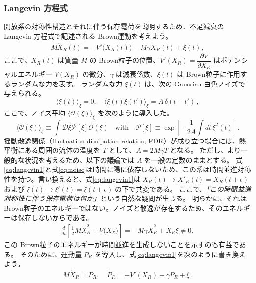 \subsubsection{Langevin 方程式}
\label{section:Langevin}
開放系の対称性構造とそれに伴う保存電荷を説明するため、不足減衰の Langevin 方程式で記述される Brown運動を考えよう。
\begin{align}
 M \ddot X_R (t) =- V'\big(X_R(t)\big) - M \gamma \dot X_R(t) +\xi (t) \,,
 \label{eq:langevin1}
\end{align}
ここで、$X_R(t)$ は質量 $M$ の Brown粒子の位置、$V'(X_R) = \dfrac{\partial V}{\partial X_R}$ はポテンシャルエネルギー $V(X_R)$ の微分、$\gamma$ は減衰係数、$\xi (t)$ は Brown粒子に作用するランダムな力を表す。
ランダムな力 $\xi(t)$ は、次の Gaussian 白色ノイズで与えられる。
\begin{equation} 
 \langle \xi(t) \rangle_\xi  = 0 , \quad 
  \langle \xi(t)\xi(t')\rangle_\xi 
  = A \,\delta(t-t')\,,
  \label{eq:noise}
\end{equation}
ここで、ノイズ平均 $\langle \mathcal{O}(\xi) \rangle_\xi$ を次のように導入した。
\begin{equation}
 \langle \mathcal{O}(\xi) \rangle_\xi 
  \equiv \int \mathcal{D} \xi
  \mathcal P[\xi] \mathcal{O} (\xi) 
  \quad \mathrm{with} \quad 
  \mathcal P[\xi] \equiv \exp \left[ - \frac{1}{2A} \int dt\, \xi^2(t) \right].
  \label{eq:NoiseAvg}
\end{equation}
揺動散逸関係（fluctuation-dissipation relation; FDR）が成り立つ場合には、熱平衡にある周囲の流体の温度を $T$ として、$A= 2 M \gamma T$ となる。
ただし、より一般的な状況を考えるため、以下の議論では $A$ を一般の定数のままとする。
式\eqref{eq:langevin1}と式\eqref{eq:noise}は時間に陽に依存しないため、この系は時間並進対称性を持つ。言い換えると、式\eqref{eq:langevin1}は $X_R(t)\to X'_R(t)=X_R(t+\epsilon)$ および $\xi(t)\to \xi'(t)=\xi(t+\epsilon)$ の下で共変である。
ここで、\textit{「この時間並進対称性に伴う保存電荷は何か」}という自然な疑問が生じる。
明らかに、それは Brown粒子のエネルギーではない。ノイズと散逸が存在するため、そのエネルギーは保存しないからである。
\begin{align}
 \frac{d}{dt}\left[\frac{1}{2} M \dot X^2_R + V \big(X_R \big) \right] 
 = - M \gamma \dot X^2_R + \dot X_R \xi \neq 0 . \,\label{consviolgv}
\end{align}
この Brown粒子のエネルギーが時間並進を生成しないことを示すのも有益である。
そのために、運動量 $P_R$ を導入し、式\eqref{eq:langevin1}を次のように書き換えよう。
\begin{align}
 \label{eq:eom_xp}
 M \dot{X}_R  = P_R ,  \quad
 \dot{P}_R = -V' (X_R) - \gamma P_R + \xi \,.
\end{align}
